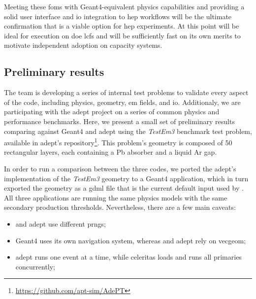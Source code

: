 Meeting these \acp{fom} with Geant4-equivalent physics capabilities and
providing a solid user interface and \ac{io} integration to \ac{hep} workflows
will be the ultimate confirmation that \celeritas is a viable option for
\ac{hep} experiments. At this point \celeritas will be ideal for execution on
\ac{doe} \acp{lcf} and will be sufficiently fast on its own merits to motivate
independent adoption on capacity systems.

\subsection{Preliminary results}

The \celeritas team is developing a series of internal test problems to validate
every aspect of the code, including physics, geometry, \ac{em} fields, and
\ac{io}. Additionaly, we are participating with the \acs{adept} project on a
series of common physics and performance benchmarks. Here, we present a small
set of preliminary results comparing \celeritas against Geant4 and \acs{adept}
using the \emph{TestEm3} benchmark test problem, available in \acs{adept}'s
repository\footnote {
    \url{https://github.com/apt-sim/AdePT}
}. This problem's geometry is composed of 50 rectangular layers, each
containing a Pb absorber and a liquid Ar gap.

In order to run a comparison between the three codes, we ported the
\acs{adept}'s implementation of the \emph{TestEm3} geometry to a Geant4
application, which in turn exported the geometry as a \acs{gdml} file that is
the current default input used by \celeritas. All three applications are running
the same physics models with the same secondary production thresholds.
Nevertheless, there are a few main caveats:
\begin{itemize}[itemsep=0pt]
    \item \celeritas and \acs{adept} use different \acp{prng};
    \item Geant4 uses its own navigation system, whereas \celeritas and
    \acs{adept} rely on \acs{vecgeom};
    \item \acs{adept} runs one event at a time, while celeritas loads and runs
    all primaries concurrently;
\end{itemize}

